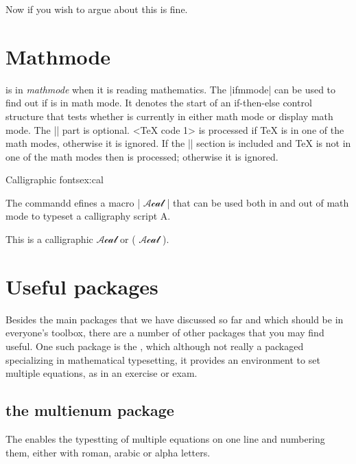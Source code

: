{Now if you wish to argue about this is fine.

\section{Mathmode}

\tex is in \textit{mathmode} when it is reading mathematics. The |ifmmode| can be used to find out if \tex is in math mode. It denotes the start of an if-then-else control structure that tests whether \tex is currently in either math mode or display math mode. The |\else| part is optional. <TeX code 1> is processed if TeX is in one of the math modes, otherwise it is ignored. 
If the |\else| section is included and TeX is not in one of the math modes then  is processed; otherwise it is ignored.


\begin{texexample}{Calligraphic fonts}{ex:cal}

\newcommand{\Acal}{\ifmmode \mathcal{Acal} \else \(\) \fi}
The commandd efines a macro |\Acal| that can be used both in and out of math mode to typeset a calligraphy script A. 

This is a calligraphic {\Acal} or ({\Acal}).
\end{texexample}


\section{Useful packages}

Besides the main packages that we have discussed so far and which should be in everyone's toolbox, there are a number of other packages that you may find useful. One such package is the , which although not really a packaged specializing in mathematical typesetting, it provides an environment to set multiple equations, as in an exercise or exam.



\subsection{the multienum package}

The  enables  the typestting of multiple equations on one line and numbering them, either with roman, arabic or alpha letters.

}
